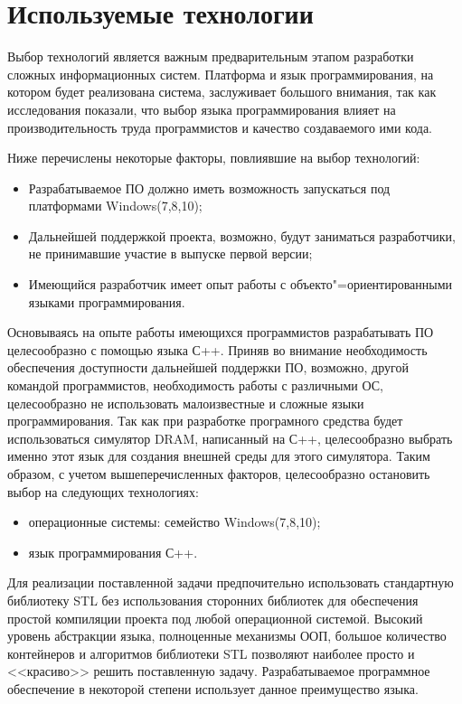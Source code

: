 \lstset{style=fsharpstyle}

\section{Используемые технологии}
\label{sec:practice:technology_used}
Выбор технологий является важным предварительным этапом разработки сложных информационных систем.
Платформа и язык программирования, на котором будет реализована система, заслуживает большого внимания, так как исследования показали, что выбор языка программирования влияет на производительность труда программистов и качество создаваемого ими кода.

Ниже перечислены некоторые факторы, повлиявшие на выбор технологий:
\begin{itemize}
\item Разрабатываемое ПО должно иметь возможность запускаться под платформами Windows(7,8,10);
\item Дальнейшей поддержкой проекта, возможно, будут заниматься разработчики, не принимавшие участие в выпуске первой версии;
\item Имеющийся разработчик имеет опыт работы с объекто"=ориентированными языками программирования.
\end{itemize}

Основываясь на опыте работы имеющихся программистов разрабатывать ПО целесообразно с помощью языка С++.
Приняв во внимание необходимость обеспечения доступности дальнейшей поддержки ПО, возможно, другой командой программистов, необходимость работы с различными ОС, целесообразно не использовать малоизвестные и сложные языки программирования.
Так как при разработке програмного средства будет использоваться симулятор DRAM, написанный на С++, целесообразно выбрать именно этот язык для создания внешней среды для этого симулятора.
Таким образом, с учетом вышеперечисленных факторов, целесообразно остановить выбор на следующих технологиях:
\begin{itemize}
  \item операционные системы: семейство Windows(7,8,10);
  \item язык программирования С++.
\end{itemize}
Для реализации поставленной задачи предпочительно использовать стандартную библиотеку STL без использования сторонних библиотек для обеспечения простой компиляции проекта под любой операционной системой.
Высокий уровень абстракции языка, полноценные механизмы ООП, большое количество контейнеров и алгоритмов библиотеки STL позволяют наиболее просто и <<красиво>> решить поставленную задачу.
Разрабатываемое программное обеспечение в некоторой степени использует данное преимущество языка.

